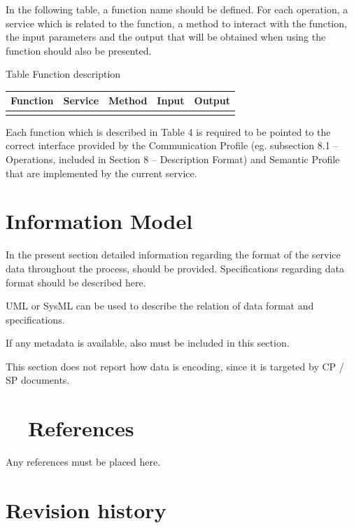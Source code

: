 \documentclass{article}
\newcounter{Table}
\renewcommand\theTable{\arabic{Table}}
\begin{document}
In the following table, a function name should be defined. For each operation, a service which is related to the function, a method to interact with the function, the input parameters and the output that will be obtained when using the function should also be presented.

Table \stepcounter{Table}{\theTable} Function description

\begin{flushleft}
\tablefirsthead{}
\tablehead{}
\tabletail{}
\tablelasttail{}
\begin{supertabular}{|m{1.4955599in}|m{1.4962599in}|m{0.8073598in}|m{1.0045599in}|m{1.2011598in}|}
\hline
{ Function} &
{ Service} &
{ Method} &
{ Input} &
{ Output }\\\hline
 &
 &
 &
 &
\\\hline
\end{supertabular}
\end{flushleft}
Each function which is described in Table 4 is required to be pointed to the correct interface provided by the Communication Profile (eg. subsection 8.1 -- Operations, included in Section 8 -- Description Format) and Semantic Profile that are implemented by the current service.

\section[Information Model]{Information Model}
In the present section detailed information regarding the format of the service data throughout the process, should be provided. Specifications regarding data format should be described here. 

UML or SysML can be used to describe the relation of data format and specifications. 

If any metadata is available, also must be included in this section.

This section does not report how data is encoding, since it is targeted by CP / SP documents.

\section[\ \ References]{\ \ References}
Any references must be placed here.

\section[Revision history]{Revision history}
\end{document}
